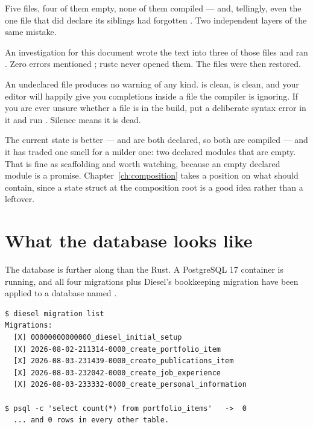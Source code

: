 Five files, four of them empty, none of them compiled --- and, tellingly, even the one file that
did declare its siblings had forgotten . Two independent layers of the same mistake.

\begin{verified}
An investigation for this document wrote the text  into three of
those files and ran . Zero errors mentioned ;
rustc never opened them. The files were then restored.
\end{verified}

\begin{pitfall}
An undeclared  file produces no warning of any kind.  is clean,
 is clean, and your editor will happily give you completions inside a file the
compiler is ignoring. If you are ever unsure whether a file is in the build, put a deliberate
syntax error in it and run . Silence means it is dead.
\end{pitfall}

The current state is better ---  and  are both declared,
so both are compiled --- and it has traded one smell for a milder one: two declared modules that are
empty. That is fine as scaffolding and worth watching, because an empty declared module is a
promise. Chapter~\ref{ch:composition} takes a position on what  should
contain, since a state struct at the composition root is a good idea rather than a leftover.

\section{What the database looks like}

The database is further along than the Rust. A PostgreSQL 17 container is running, and all four
migrations plus Diesel's bookkeeping migration have been applied to a database named
.

\begin{verified}
\begin{lstlisting}[style=out]
$ diesel migration list
Migrations:
  [X] 00000000000000_diesel_initial_setup
  [X] 2026-08-02-211314-0000_create_portfolio_item
  [X] 2026-08-03-231439-0000_create_publications_item
  [X] 2026-08-03-232042-0000_create_job_experience
  [X] 2026-08-03-233332-0000_create_personal_information

$ psql -c 'select count(*) from portfolio_items'   ->  0
  ... and 0 rows in every other table.
\end{lstlisting}
\end{verified}

